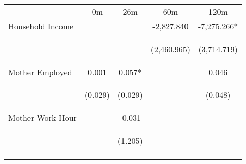 \begin{tabular}{lcccc}
\hline \noalign{\smallskip} & 0m & 26m & 60m & 120m\\
\noalign{\smallskip}\hline \noalign{\smallskip}Household Income &  &  & -2,827.840 & -7,275.266*\\
 & \begin{footnotesize}\end{footnotesize} & \begin{footnotesize}\end{footnotesize} & \begin{footnotesize}(2,460.965)\end{footnotesize} & \begin{footnotesize}(3,714.719)\end{footnotesize}\\
\noalign{\smallskip}Mother Employed & 0.001 & 0.057* &  & 0.046\\
 & \begin{footnotesize}(0.029)\end{footnotesize} & \begin{footnotesize}(0.029)\end{footnotesize} & \begin{footnotesize}\end{footnotesize} & \begin{footnotesize}(0.048)\end{footnotesize}\\
\noalign{\smallskip}Mother Work Hour &  & -0.031 &  & \\
 & \begin{footnotesize}\end{footnotesize} & \begin{footnotesize}(1.205)\end{footnotesize} & \begin{footnotesize}\end{footnotesize} & \begin{footnotesize}\end{footnotesize}\\
\noalign{\smallskip}\hline\end{tabular}\\

